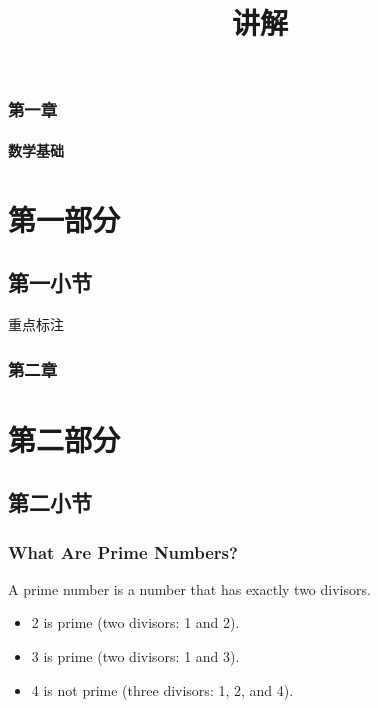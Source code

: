 \documentclass{beamer}
\begin{document}
\title{讲解}
\begin{frame}
    \titlepage
\end{frame}
\begin{frame}
    \tableofcontents
\end{frame}
\begin{frame}
    \frametitle{第一章}
    \framesubtitle{数学基础}
    \section{第一部分}
    \subsection{第一小节}
    \lipsum[2]
    \alert{重点标注}
\end{frame}
\begin{frame}
    \frametitle{第二章}
    \section{第二部分}
    \subsection{第二小节}
    \lipsum[2]
\end{frame}
\begin{frame}
    \frametitle{What Are Prime Numbers?}
    \begin{definition}
        A \alert{prime number} is a number that has exactly two divisors.
    \end{definition}
    \begin{example}
        \begin{itemize}
            \item 2 is prime (two divisors: 1 and 2).
            \pause
            \item 3 is prime (two divisors: 1 and 3).
            \pause
            \item 4 is not prime (\alert{three} divisors: 1, 2, and 4).
        \end{itemize}
    \end{example}
\end{frame}
\end{document}
